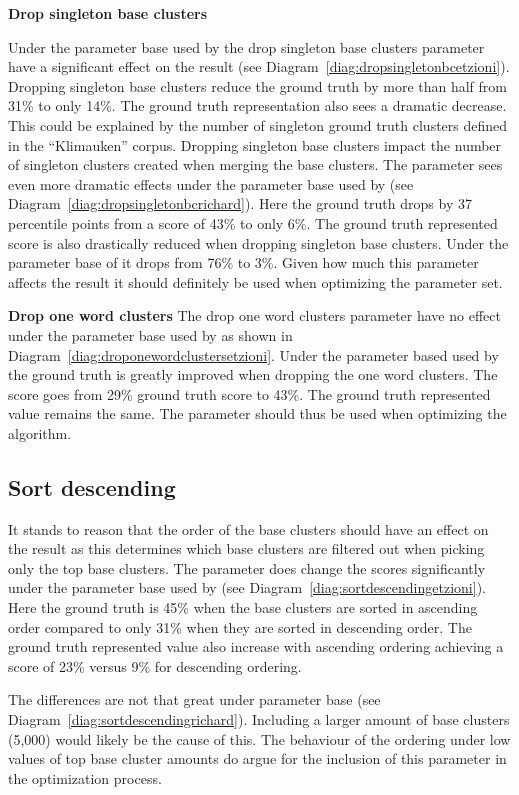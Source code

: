 \textbf{Drop singleton base clusters}

Under the parameter base used by \citeauthor{Oren1998} the drop singleton base clusters parameter have a significant effect on the result (see Diagram~\ref{diag:dropsingletonbcetzioni}). Dropping singleton base clusters reduce the ground truth by more than half from 31\% to only 14\%. The ground truth representation also sees a dramatic decrease. This could be explained by the number of singleton ground truth clusters defined in the ``Klimauken'' corpus. Dropping singleton base clusters impact the number of singleton clusters created when merging the base clusters. The parameter sees even more dramatic effects under the parameter base used by \supervisor (see Diagram~\ref{diag:dropsingletonbcrichard}). Here the ground truth drops by 37 percentile points from a score of 43\% to only 6\%. The ground truth represented score is also drastically reduced when dropping singleton base clusters. Under the parameter base of \supervisor it drops from 76\% to 3\%. Given how much this parameter affects the result it should definitely be used when optimizing the parameter set.

\textbf{Drop one word clusters}
The drop one word clusters parameter have no effect under the parameter base used by \citeauthor{Oren1998} as shown in Diagram~\ref{diag:droponewordclustersetzioni}. Under the parameter based used by \supervisor the ground truth is greatly improved when dropping the one word clusters. The score goes from 29\% ground truth score to 43\%. The ground truth represented value remains the same. The parameter should thus be used when optimizing the algorithm.

\subsection{Sort descending}
It stands to reason that the order of the base clusters should have an effect on the result as this determines which base clusters are filtered out when picking only the top base clusters. The parameter does change the scores significantly under the parameter base used by \citeauthor{Oren1998} (see Diagram~\ref{diag:sortdescendingetzioni}). Here the ground truth is 45\% when the base clusters are sorted in ascending order compared to only 31\% when they are sorted in descending order. The ground truth represented value also increase with ascending ordering achieving a score of 23\% versus 9\% for descending ordering.

The differences are not that great under \supervisor parameter base (see Diagram~\ref{diag:sortdescendingrichard}). Including a larger amount of base clusters (5,000) would likely be the cause of this. The behaviour of the ordering under low values of top base cluster amounts do argue for the inclusion of this parameter in the optimization process.

